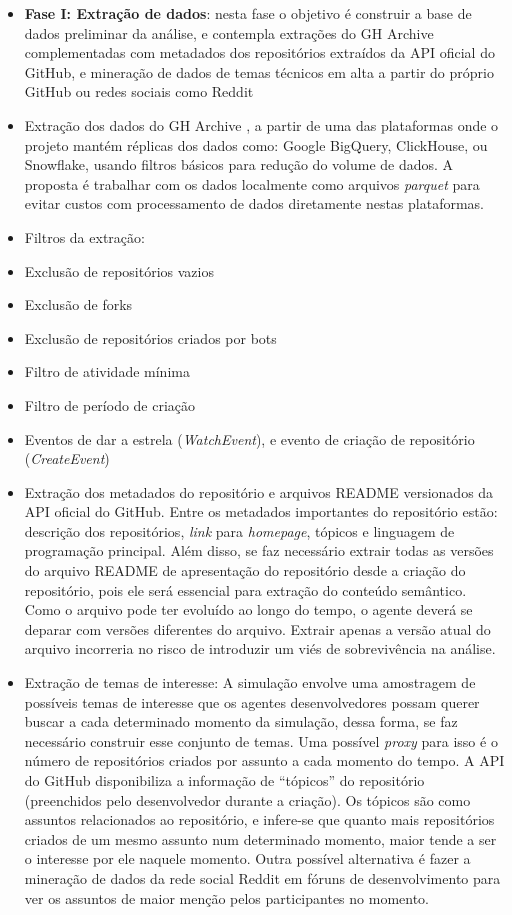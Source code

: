 \documentclass[12pt,oneside,a4paper,brazil,sumario=tradicional]{abntex2}
\begin{document}
\begin{itemize}
  \item \textbf{Fase I: Extração de dados}:  nesta fase o objetivo é construir a base de dados preliminar da análise, e contempla extrações do GH Archive complementadas com metadados dos repositórios extraídos da API oficial do GitHub, e mineração de dados de temas técnicos em alta a partir do próprio GitHub ou redes sociais como Reddit
  \item Extração dos dados do GH Archive \parencite{grigorik_gharchive}, a partir de uma das plataformas onde o projeto mantém réplicas dos dados como: Google BigQuery, ClickHouse, ou Snowflake, usando filtros básicos para redução do volume de dados. A proposta é trabalhar com os dados localmente como arquivos \textit{parquet }\parencite{apacheparquet2024} para evitar custos com processamento de dados diretamente nestas plataformas.
  \item Filtros da extração:
  \item Exclusão de repositórios vazios
  \item Exclusão de forks
  \item Exclusão de repositórios criados por bots
  \item Filtro de atividade mínima
  \item Filtro de período de criação
  \item Eventos de dar a estrela (\textit{WatchEvent}), e evento de criação de repositório (\textit{CreateEvent})
  \item Extração dos metadados do repositório e arquivos README versionados da API oficial do GitHub. Entre os metadados importantes do repositório estão: descrição dos repositórios, \textit{link }para \textit{homepage}, tópicos e linguagem de programação principal. Além disso, se faz necessário extrair todas as versões do arquivo README de apresentação do repositório desde a criação do repositório, pois ele será essencial para extração do conteúdo semântico. Como o arquivo pode ter evoluído ao longo do tempo, o agente deverá se deparar com versões diferentes do arquivo. Extrair apenas a versão atual do arquivo incorreria no risco de introduzir um viés de sobrevivência na análise.
  \item Extração de temas de interesse: A simulação envolve uma amostragem de possíveis temas de interesse que os agentes desenvolvedores possam querer buscar a cada determinado momento da simulação, dessa forma, se faz necessário construir esse conjunto de temas. Uma possível \textit{proxy }para isso é o número de repositórios criados por assunto a cada momento do tempo. A API do GitHub disponibiliza a informação de “tópicos” do repositório (preenchidos pelo desenvolvedor durante a criação).  Os  tópicos são como assuntos relacionados ao repositório, e infere-se que quanto mais repositórios criados de um mesmo assunto num determinado momento, maior tende a ser o interesse por ele naquele momento. Outra possível alternativa é fazer a mineração de dados da rede social Reddit em fóruns de desenvolvimento para ver os assuntos de maior menção pelos participantes no momento.

\end{itemize}
\end{document}
